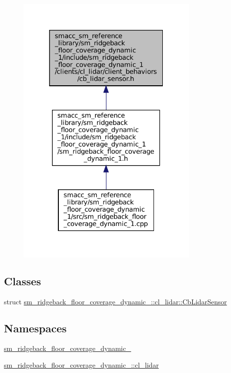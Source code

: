 \nopagebreak
\begin{figure}[H]
\begin{center}
\leavevmode
\includegraphics[width=253pt]{sm__ridgeback__floor__coverage__dynamic__1_2include_2sm__ridgeback__floor__coverage__dynamic__1_b16d84a24aa38e6e9c4c6b11d9ba7614}
\end{center}
\end{figure}
\subsection*{Classes}
\begin{DoxyCompactItemize}
\item 
struct \hyperlink{structsm__ridgeback__floor__coverage__dynamic__1_1_1cl__lidar_1_1CbLidarSensor}{sm\+\_\+ridgeback\+\_\+floor\+\_\+coverage\+\_\+dynamic\+\_\+::cl\+\_\+lidar\+::\+Cb\+Lidar\+Sensor}
\end{DoxyCompactItemize}
\subsection*{Namespaces}
\begin{DoxyCompactItemize}
\item 
 \hyperlink{namespacesm__ridgeback__floor__coverage__dynamic__1}{sm\+\_\+ridgeback\+\_\+floor\+\_\+coverage\+\_\+dynamic\+\_}
\item 
 \hyperlink{namespacesm__ridgeback__floor__coverage__dynamic__1_1_1cl__lidar}{sm\+\_\+ridgeback\+\_\+floor\+\_\+coverage\+\_\+dynamic\+\_\+::cl\+\_\+lidar}
\end{DoxyCompactItemize}
